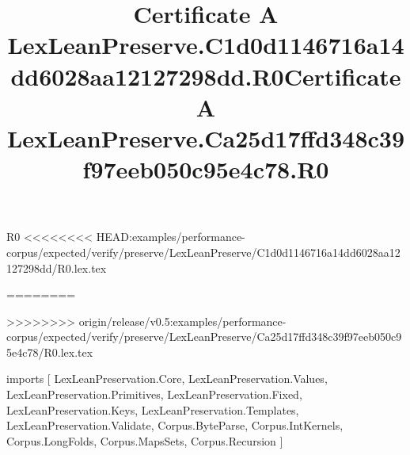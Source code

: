 \begin{lexlean}{R0}
<<<<<<<< HEAD:examples/performance-corpus/expected/verify/preserve/LexLeanPreserve/C1d0d1146716a14dd6028aa12127298dd/R0.lex.tex
\title{Certificate A LexLeanPreserve.C1d0d1146716a14dd6028aa12127298dd.R0}
========
\title{Certificate A LexLeanPreserve.Ca25d17ffd348c39f97eeb050c95e4c78.R0}
>>>>>>>> origin/release/v0.5:examples/performance-corpus/expected/verify/preserve/LexLeanPreserve/Ca25d17ffd348c39f97eeb050c95e4c78/R0.lex.tex
\begin{coremodule}
imports [
  LexLeanPreservation.Core,
  LexLeanPreservation.Values,
  LexLeanPreservation.Primitives,
  LexLeanPreservation.Fixed,
  LexLeanPreservation.Keys,
  LexLeanPreservation.Templates,
  LexLeanPreservation.Validate,
  Corpus.ByteParse,
  Corpus.IntKernels,
  Corpus.LongFolds,
  Corpus.MapsSets,
  Corpus.Recursion
]


\end{coremodule}
\end{lexlean}
